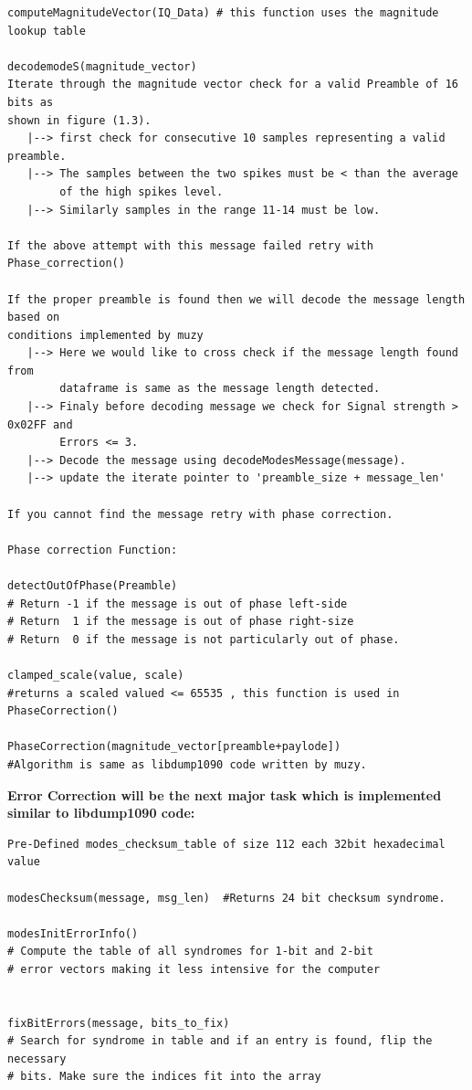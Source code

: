 \documentclass[11pt,a4paper]{report}
\begin{document}
\begin{verbatim}
computeMagnitudeVector(IQ_Data) # this function uses the magnitude lookup table

decodemodeS(magnitude_vector)
Iterate through the magnitude vector check for a valid Preamble of 16 bits as 
shown in figure (1.3). 
   |--> first check for consecutive 10 samples representing a valid preamble.
   |--> The samples between the two spikes must be < than the average 
        of the high spikes level.
   |--> Similarly samples in the range 11-14 must be low.

If the above attempt with this message failed retry with Phase_correction()  

If the proper preamble is found then we will decode the message length based on 
conditions implemented by muzy
   |--> Here we would like to cross check if the message length found from 
        dataframe is same as the message length detected.
   |--> Finaly before decoding message we check for Signal strength > 0x02FF and 
        Errors <= 3.  
   |--> Decode the message using decodeModesMessage(message).
   |--> update the iterate pointer to 'preamble_size + message_len'     

If you cannot find the message retry with phase correction.

Phase correction Function:

detectOutOfPhase(Preamble) 
# Return -1 if the message is out of phase left-side
# Return  1 if the message is out of phase right-size
# Return  0 if the message is not particularly out of phase.

clamped_scale(value, scale)
#returns a scaled valued <= 65535 , this function is used in PhaseCorrection()

PhaseCorrection(magnitude_vector[preamble+paylode])
#Algorithm is same as libdump1090 code written by muzy.
\end{verbatim} 
\textbf{Error Correction will be the next major task which is implemented similar to libdump1090 code:}
\begin{verbatim}
Pre-Defined modes_checksum_table of size 112 each 32bit hexadecimal value

modesChecksum(message, msg_len)  #Returns 24 bit checksum syndrome.

modesInitErrorInfo()   
# Compute the table of all syndromes for 1-bit and 2-bit 
# error vectors making it less intensive for the computer


fixBitErrors(message, bits_to_fix)
# Search for syndrome in table and if an entry is found, flip the necessary
# bits. Make sure the indices fit into the array
\end{verbatim} 
\end{document}
